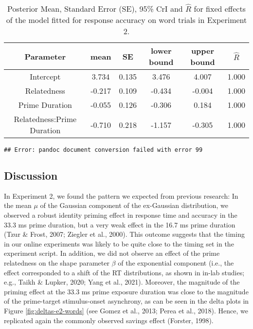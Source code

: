 \documentclass[
  english,
  man,floatsintext]{apa6}
\begin{document}
\begin{table}[H]

\begin{center}
\begin{threeparttable}

\caption{\label{tab:exp2-acc-blmm-table}Posterior Mean, Standard Error (SE), 95\% CrI and \(\hat{R}\) for fixed effects of the model fitted for response accuracy on word trials in Experiment 2.}

\small{

\begin{tabular}{cccccc}
\toprule
Parameter & \multicolumn{1}{c}{mean} & \multicolumn{1}{c}{SE} & \multicolumn{1}{c}{lower bound} & \multicolumn{1}{c}{upper bound} & \multicolumn{1}{c}{$\hat{R}$}\\
\midrule
Intercept & 3.734 & 0.135 & 3.476 & 4.007 & 1.000\\
Relatedness & -0.217 & 0.109 & -0.434 & -0.004 & 1.000\\
Prime Duration & -0.055 & 0.126 & -0.306 & 0.184 & 1.000\\
Relatedness:Prime Duration & -0.710 & 0.218 & -1.157 & -0.305 & 1.000\\
\bottomrule
\end{tabular}

}

\end{threeparttable}
\end{center}

\end{table}

\begin{verbatim}
## Error: pandoc document conversion failed with error 99
\end{verbatim}

\hypertarget{discussion-1}{%
\subsection{Discussion}\label{discussion-1}}

In Experiment 2, we found the pattern we expected from previous research: In the mean \(\mu\) of the Gaussian component of the ex-Gaussian distribution, we observed a robust identity priming effect in response time and accuracy in the 33.3 ms prime duration, but a very weak effect in the 16.7 ms prime duration (Tzur \& Frost, 2007; Ziegler et al., 2000). This outcome suggests that the timing in our online experiments was likely to be quite close to the timing set in the experiment script. In addition, we did not observe an effect of the prime relatedness on the shape parameter \(\beta\) of the exponential component (i.e., the effect corresponded to a shift of the RT distributions, as shown in in-lab studies; e.g., Taikh \& Lupker, 2020; Yang et al., 2021). Moreover, the magnitude of the priming effect at the 33.3 ms prime exposure duration was close to the magnitude of the prime-target stimulus-onset asynchrony, as can be seen in the delta plots in Figure \ref{fig:deltas-e2-words} (see Gomez et al., 2013; Perea et al., 2018). Hence, we replicated again the commonly observed savings effect (Forster, 1998).
\end{document}
